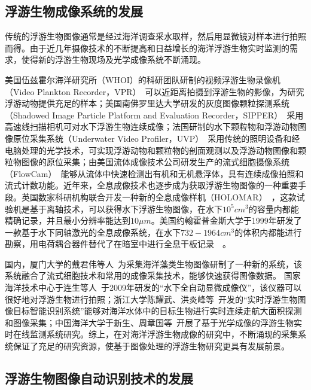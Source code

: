 \subsection{浮游生物成像系统的发展}

传统的浮游生物图像通常是经过海洋调查采水取样，然后用显微镜对样本进行拍照而得。由于近几年摄像技术的不断提高和日益增长的海洋浮游生物实时监测的需求，使得新的浮游生物现场及光学成像系统不断涌现。

美国伍兹霍尔海洋研究所（WHOI）的科研团队研制的视频浮游生物录像机（Video Plankton Recorder，VPR）~\cite{davis2005three}可以近距离拍摄到浮游生物的影像，为研究浮游动物提供充足的样本；美国南佛罗里达大学研发的灰度图像颗粒探测系统（Shadowed Image Particle Platform and Evaluation Recorder，SIPPER）~\cite{remsen2004you}采用高速线扫描相机可对水下浮游生物连续成像；法国研制的水下颗粒物和浮游动物图像原位采集系统（Underwater Video Profiler，UVP）~\cite{davis1992video}采用传统的照明设备和经电脑处理的光学技术，可实现浮游动物和颗粒物的剖面观测以及浮游动物图像和颗粒物图像的原位采集；由美国流体成像技术公司研发生产的流式细胞摄像系统（FlowCam）~\cite{benfield2007rapid}能够从流体中快速检测出有机和无机悬浮体，具有连续成像拍照和流式计数功能。近年来，全息成像技术也逐步成为获取浮游生物图像的一种重要手段。英国数家科研机构联合开发一种新的全息成像样机（HOLOMAR）~\cite{Watson2004HoloMar}，这款试验机是基于离轴技术，可以获得水下浮游生物图像，在水下$10^5cm^3$的容量内都能精确记录，并且最小分辨率能达到$10\mu m$。美国约翰霍普金斯大学于1999年研发了一款基于水下同轴激光的全息成像系统，在水下$732-1964cm^3$的体积内都能进行勘察，用电荷耦合器件替代了在暗室中进行全息干板记录~\cite{katz1999submersible}~\cite{pfitsch2005development}。

国内，厦门大学的戴君伟等人~\cite{戴君伟2006海洋赤潮生物图像实时采集系统}为采集海洋藻类生物图像研制了一种新的系统，该系统融合了流式细胞技术和常用的成像采集技术，能够快速获得图像数据。
国家海洋技术中心于连生等人~\cite{于翔2009水下全自动显微成像仪}于2009年研发的“水下全自动显微成像仪”，该仪器可以很好地对浮游生物进行拍照；浙江大学陈耀武、洪炎峰等~\cite{tan2012实时浮游生物图像目标智能识别系统设计}开发的“实时浮游生物图像目标智能识别系统”能够对海洋水体中的目标生物进行实时连续走航大面积探测和图像采集；中国海洋大学于新生、周章国等~\cite{zhou2008design}开展了基于光学成像的浮游生物实时在线监测系统研究。综上，在对海洋浮游生物成像的研究中，不断涌现的采集系统保证了充足的研究资源，使基于图像处理的浮游生物研究更具有发展前景。

\subsection{浮游生物图像自动识别技术的发展}

